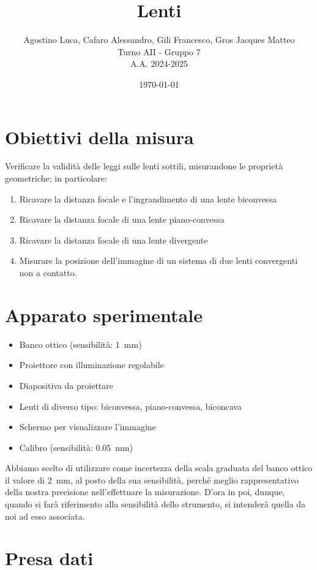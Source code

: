 \documentclass[a4paper]{article}
\title{\textbf{Lenti}}
\author{Agostino Luca, Cafaro Alessandro, Gili Francesco, Gros Jacques Matteo\\ Turno AII - Gruppo 7\\A.A. 2024-2025}
\date{\today}
\begin{document}
    
\maketitle

\tableofcontents
\newpage

\section{Obiettivi della misura}
    Verificare la validità delle leggi sulle lenti sottili, misurandone le proprietà geometriche; in particolare:
    \begin{enumerate}
        \item Ricavare la distanza focale e l'ingrandimento di una lente biconvessa
        \item Ricavare la distanza focale di una lente piano-convessa
        \item Ricavare la distanza focale di una lente divergente
        \item Misurare la posizione dell'immagine di un sistema di due lenti convergenti non a contatto.
    \end{enumerate}
\section{Apparato sperimentale}
    \begin{itemize}
        \item Banco ottico (sensibilità: \SI{1}{\mm})
        \item Proiettore con illuminazione regolabile
        \item Diapositiva da proiettare
        \item Lenti di diverso tipo: biconvessa, piano-convessa, biconcava
        \item Schermo per visualizzare l'immagine
        \item Calibro (sensibilità: \SI{0.05}{\mm})
    \end{itemize}
    Abbiamo scelto di utilizzare come incertezza della scala graduata del banco ottico il valore di \SI{2}{\mm}, al posto della sua sensibilità, perché meglio rappresentativo della nostra precisione nell'effettuare la misurazione. D'ora in poi, dunque, quando si farà riferimento alla sensibilità dello strumento, si intenderà quella da noi ad esso associata.
\section{Presa dati}
\end{document}
